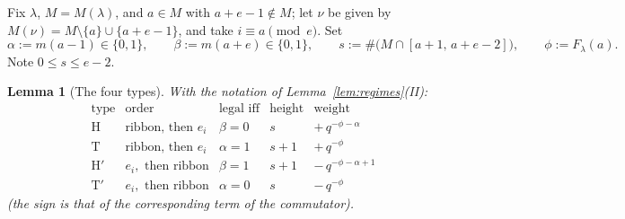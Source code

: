 \documentclass[11pt]{article}
\theoremstyle{plain}
\newtheorem{lemma}[theorem]{Lemma}
\theoremstyle{definition}
\begin{document}
Fix $\lambda$, $M=M(\lambda)$, and $a\in M$ with $a+e-1\notin M$; let $\nu$ be given
by $M(\nu)=M\setminus\{a\}\cup\{a+e-1\}$, and take $i\equiv a\pmod e$. Set
\begin{equation}\label{eq:stats}
\alpha:=m(a-1)\in\{0,1\},\qquad
\beta:=m(a+e)\in\{0,1\},\qquad
s:=\#\big(M\cap[a+1,\,a+e-2]\big),\qquad
\phi:=F_\lambda(a).
\end{equation}
Note $0\le s\le e-2$.

\begin{lemma}[The four types]\label{lem:four}
With the notation of Lemma~\ref{lem:regimes}(II):
\[
\begin{array}{lllll}
\text{type} & \text{order} & \text{legal iff} & \text{height} & \text{weight}\\[2pt]
\mathrm H  & \text{ribbon, then }e_i & \beta=0 & s   & +\,q^{-\phi-\alpha}\\
\mathrm T  & \text{ribbon, then }e_i & \alpha=1 & s+1 & +\,q^{-\phi}\\
\mathrm H' & e_i,\text{ then ribbon} & \beta=1 & s+1 & -\,q^{-\phi-\alpha+1}\\
\mathrm T' & e_i,\text{ then ribbon} & \alpha=0 & s   & -\,q^{-\phi}
\end{array}
\]
(the sign is that of the corresponding term of the commutator).
\end{lemma}
\end{document}
